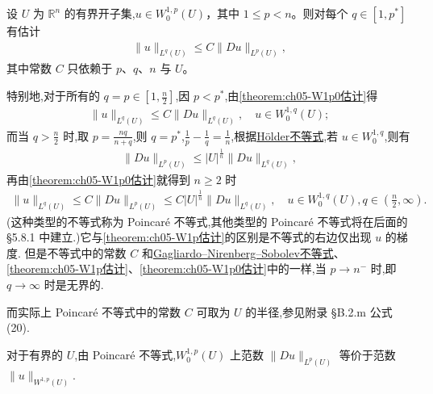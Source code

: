 \documentclass[../../main.tex]{subfiles}
\begin{document}
\begin{theorem}\label{theorem:ch05-W1p0估计}
设 $U$ 为 $\mathbb{R}^{n}$ 的有界开子集,$u\in W^{1,p}_{0}(U)$，其中 $1\leqslant p<n$。则对每个 $q\in[1,p^{*}]$ 有估计
\begin{align*}
\|u\|_{L^{q}(U)}\leqslant C\|Du\|_{L^{p}(U)},
\end{align*}
其中常数 $C$ 只依赖于 $p$、$q$、$n$ 与 $U$。
\end{theorem}
\begin{remark}
特别地,对于所有的 $q=p\in \left[1,\frac{n}{2}\right]$,因 $p<p^*$,由\cref{theorem:ch05-W1p0估计}得
\begin{align*}
\|u\|_{L^q(U)} \leqslant C\|Du\|_{L^q(U)}, \quad u \in W_0^{1,q}(U);
\end{align*}
而当 $q>\frac{n}{2}$ 时,取 $p=\frac{nq}{n+q}$,则 $q=p^*$,$\frac{1}{p}-\frac{1}{q}=\frac{1}{n}$,根据\hyperref[Real Analysis-theorem:实变函数--Hölder不等式]{Hölder不等式},若 $u\in W_0^{1,q}$,则有
\begin{align*}
\|Du\|_{L^p(U)} \leqslant |U|^{\frac{1}{n}}\|Du\|_{L^q(U)},
\end{align*}
再由\cref{theorem:ch05-W1p0估计}就得到 $n\geqslant 2$ 时
\begin{align*}
\|u\|_{L^q(U)} \leqslant C\|Du\|_{L^p(U)} \leqslant C|U|^{\frac{1}{n}}\|Du\|_{L^q(U)}, \quad u \in W_0^{1,q}(U), q \in \left(\frac{n}{2}, \infty \right).
\end{align*}
(这种类型的不等式称为 Poincaré 不等式,其他类型的 Poincaré 不等式将在后面的 §5.8.1 中建立.)它与\cref{theorem:ch05-W1p估计}的区别是不等式的右边仅出现 $u$ 的梯度. 但是不等式中的常数 $C$ 和\hyperref[theorem:Gagliardo--Nirenberg--Sobolev不等式]{Gagliardo--Nirenberg--Sobolev不等式}、\cref{theorem:ch05-W1p估计}、\cref{theorem:ch05-W1p0估计}中的一样,当 $p \to n^-$ 时,即 $q \to \infty$ 时是无界的.

而实际上 Poincaré 不等式中的常数 $C$ 可取为 $U$ 的半径,参见附录 §B.2.m 公式 (20).

对于有界的 $U$,由 Poincaré 不等式,$W_0^{1,p}(U)$ 上范数 $\|Du\|_{L^p(U)}$ 等价于范数 $\|u\|_{W^{1,p}(U)}$.
\end{remark}
\end{document}
